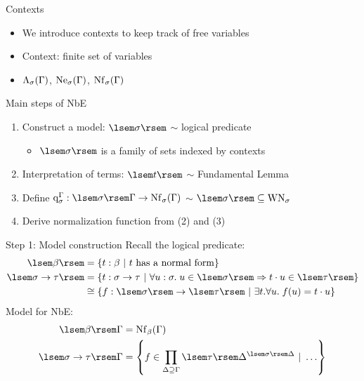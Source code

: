 \documentclass{beamer}
\begin{document}
\begin{frame}{Contexts}
\begin{itemize}
    \item We introduce contexts to keep track of free variables
    \item Context: finite set of variables
    \item $\Lambda_{\sigma}(\Gamma)$, $\mathrm{Ne}_{\sigma}(\Gamma)$, $\mathrm{Nf}_{\sigma}(\Gamma)$
\end{itemize}
\end{frame}

\begin{frame}{Main steps of NbE}
\begin{enumerate}
    \item Construct a model: $\sem{\sigma}$ $\sim$ logical predicate
    \begin{itemize}
        \item $\sem{\sigma}$ is a family of sets indexed by contexts
    \end{itemize}
    \item Interpretation of terms: $\sem{t}$ $\sim$ Fundamental Lemma
    \item Define $\quotef{\Gamma}{\sigma} : \sem{\sigma} \Gamma \to \cNf{\Gamma}{\sigma}$ $\sim$ $\sem{\sigma} \subs \mathrm{WN}_\sigma$
    \item Derive normalization function from (2) and (3)
\end{enumerate}
\end{frame}

\begin{frame}{Step 1: Model construction}
Recall the logical predicate:
\begin{align*}
\sem{\beta}
    &= \setof{\typedtm{t}{\beta}}{t\text{ has a normal form}} \\
\sem{\functy{\sigma}{\tau}}
    &= \setof{\typedtm{t}{\functy{\sigma}{\tau}}}{\forall \typedtm{u}{\sigma}.\;u \in \sem{\sigma} \implies \app{t}{u} \in \sem{\tau}} \\
    &\cong \setof{f : \sem{\sigma} \to \sem{\tau}}{\exists t.\forall u.\;f(u) = \app{t}{u}}
\end{align*}
Model for NbE:
\begin{align*}
\sem{\beta} \Gamma &= \cNf{\Gamma}{\beta} \\
\sem{\functy{\sigma}{\tau}} \Gamma &= \setof{f \in \prod_{\Delta \sups \Gamma}{\funcset{\sem{\sigma} \Delta}{\sem{\tau} \Delta}}}{\ldots}
\end{align*}
\end{frame}
\end{document}
